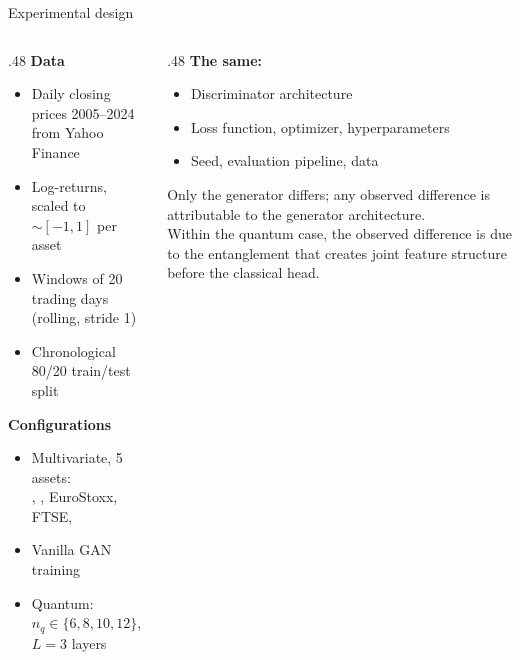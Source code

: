 \begin{frame}{Experimental design}
    \begin{columns}[T]
    \begin{column}{.48\textwidth}
        \textbf{Data}
        \begin{itemize}
            \item Daily closing prices 2005--2024 from Yahoo Finance
            \item Log-returns, scaled to $\sim[-1,1]$ per asset
            \item Windows of 20 trading days (rolling, stride 1)
            \item Chronological 80/20 train/test split
        \end{itemize}
        \medskip

        \textbf{Configurations}
        \begin{itemize}
            \item Multivariate, 5 assets:\\
            \smi, \dax, EuroStoxx, FTSE, \sap
            \item Vanilla GAN training
            \item Quantum: $n_q \in \{6,8,10,12\}$,
            $L=3$ layers
        \end{itemize}
    \end{column}
    \hfill
    \begin{column}{.48\textwidth}
        \textbf{The same:}
        \begin{itemize}
            \item Discriminator architecture
            \item Loss function, optimizer, hyperparameters
            \item Seed, evaluation pipeline, data
        \end{itemize}
        \medskip

        Only the generator differs; any observed difference is attributable to the generator architecture. \\
        Within the quantum case, the observed difference is due to the entanglement that creates joint feature structure before the classical head.
    \end{column}
    \end{columns}
\end{frame}
